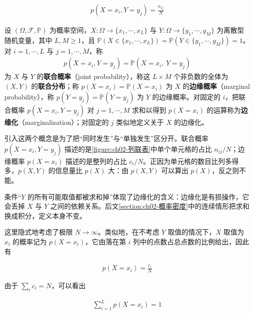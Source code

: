 \documentclass[../../main.tex]{subfiles}
\begin{document}
\begin{align}
  p(X=x_i,Y=y_j) = \frac{n_{ij}}{N}
  \label{align:ch02-联合概率定义}
\end{align}

\begin{definition}[联合概率与边缘概率]\label{definition:ch02-联合概率}
设 $(\Omega,\mathcal{F},\mathbb{P})$ 为概率空间，$X:\Omega\to\{x_1,\cdots,x_L\}$ 与 $Y:\Omega\to\{y_1,\cdots,y_M\}$ 为离散型随机变量，其中 $L,M\geqslant1$，且 $\mathbb{P}(X\in\{x_1,\cdots,x_L\})=\mathbb{P}(Y\in\{y_1,\cdots,y_M\})=1$。对 $i=1,\cdots,L$ 与 $j=1,\cdots,M$，称
\begin{align*}
  p(X=x_i,Y=y_j)=\mathbb{P}(X=x_i,\ Y=y_j)
\end{align*}
为 $X$ 与 $Y$ 的\textbf{联合概率}（joint probability），称这 $L\times M$ 个非负数的全体为 $(X,Y)$ 的\textbf{联合分布}；称 $p(X=x_i)=\mathbb{P}(X=x_i)$ 为 $X$ 的\textbf{边缘概率}（marginal probability），称 $p(Y=y_j)=\mathbb{P}(Y=y_j)$ 为 $Y$ 的边缘概率。对固定的 $i$，把联合概率 $p(X=x_i,Y=y_j)$ 对 $j=1,\cdots,M$ 求和以得到 $p(X=x_i)$ 的运算称为\textbf{边缘化}（marginalization）；对固定的 $j$ 类似地定义关于 $X$ 的边缘化。
\end{definition}

\begin{remark}
引入这两个概念是为了把“同时发生”与“单独发生”区分开。联合概率 $p(X=x_i,Y=y_j)$ 描述的是\cref{figure:ch02-列联表}中单个单元格的占比 $n_{ij}/N$；边缘概率 $p(X=x_i)$ 描述的是整列的占比 $c_i/N$。正因为单元格的数目比列多得多，$p(X,Y)$ 的信息量比 $p(X)$ 大：由 $p(X,Y)$ 可以算出 $p(X)$，反之则不能。

条件“$Y$ 的所有可能取值都被求和掉”体现了边缘化的含义：边缘化是有损操作，它会丢掉 $X$ 与 $Y$ 之间的依赖关系。后文\cref{section:ch02-概率密度}中的连续情形把求和换成积分，定义本身不变。
\end{remark}

这里隐式地考虑了极限 $N\to\infty$。类似地，在不考虑 $Y$ 取值的情况下，$X$ 取值为 $x_i$ 的概率记为 $p(X=x_i)$，它由落在第 $i$ 列中的点数占总点数的比例给出，因此有

\begin{align}
  p(X=x_i) = \frac{c_i}{N}
  \label{align:ch02-边缘概率定义}
\end{align}

由于 $\sum_i c_i = N$，可以看出

\begin{align}
  \sum_{i=1}^{L} p(X=x_i) = 1
  \label{align:ch02-边缘概率归一化}
\end{align}
\end{document}
